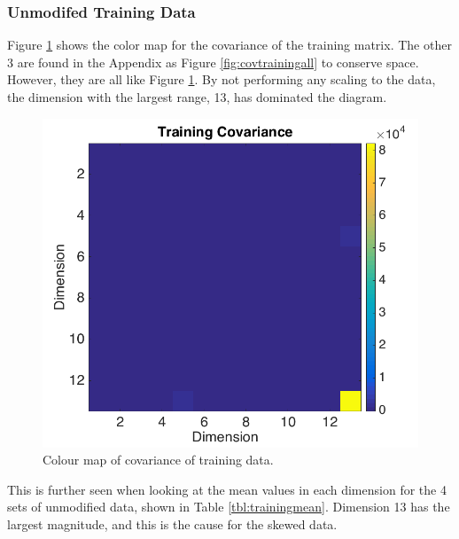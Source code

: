 \documentclass[a4paper, 10pt, conference]{ieeeconf}
\begin{document}
\subsubsection{Unmodifed Training Data}
Figure \ref{fig:covtrainingone} shows the color map for the covariance of the training matrix. The other 3 are found in the Appendix as Figure \ref{fig:covtrainingall} to conserve space. However, they are all like Figure \ref{fig:covtrainingone}. By not performing any scaling to the data, the dimension with the largest range, 13, has dominated the diagram.

\begin{figure}[!ht]
    \centering
    \includegraphics[width=\linewidth]{pic/covtraining.png}
    \caption{Colour map of covariance of training data.}
    \label{fig:covtrainingone}
\end{figure}

This is further seen when looking at the mean values in each dimension for the 4 sets of unmodified data, shown in Table \ref{tbl:trainingmean}. Dimension 13 has the largest magnitude, and this is the cause for the skewed data.
\end{document}
